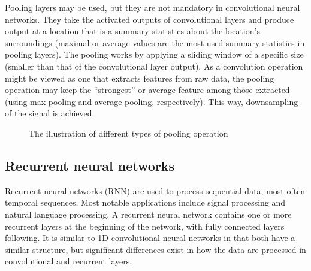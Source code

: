 Pooling layers may be used, but they are not mandatory in convolutional neural networks. They take the activated outputs of convolutional layers and produce output at a location that is a summary statistics about the location's surroundings (maximal or average values are the most used summary statistics in pooling layers). The pooling works by applying a sliding window of a specific size (smaller than that of the convolutional layer output). As a convolution operation might be viewed as one that extracts features from raw data, the pooling operation may keep the ``strongest'' or average feature among those extracted (using max pooling and average pooling, respectively). This way, downsampling of the signal is achieved.

\begin{figure}
    \centering
    \vfill
    \caption{The illustration of different types of pooling operation}
    \label{fig:Pooling}
\end{figure}

\subsection{Recurrent neural networks}

Recurrent neural networks (RNN) are used to process sequential data, most often temporal sequences. Most notable applications include signal processing and natural language processing. A recurrent neural network contains one or more recurrent layers at the beginning of the network, with fully connected layers following. It is similar to 1D convolutional neural networks in that both have a similar structure, but significant differences exist in how the data are processed in convolutional and recurrent layers.

